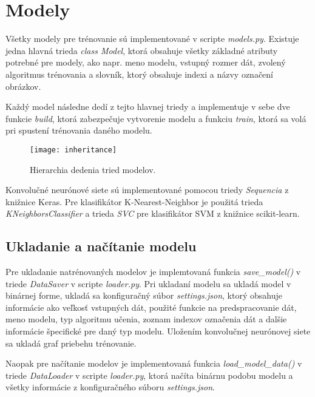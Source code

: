 
\section{Modely}
\label{sec:modely}
Všetky modely pre trénovanie sú implementované v scripte \textit{models.py}.
Existuje jedna hlavná trieda \textit{class Model}, ktorá obsahuje všetky základné atributy potrebné pre modely, ako napr.
    meno modelu, vstupný rozmer dát, zvolený algoritmus trénovania a slovník, ktorý obsahuje indexi a názvy označení obrázkov.

Každý model následne dedí z tejto hlavnej triedy a implementuje v sebe dve funkcie \textit{build}, ktorá zabezpečuje vytvorenie modelu a
    funkciu \textit{train}, ktorá sa volá pri spustení trénovania daného modelu.

\begin{figure}[H]
    \centering
    \texttt{[image: inheritance]}
    \caption{Hierarchia dedenia tried modelov.}
    \label{pic:inheritance}
\end{figure}

Konvolučné neurónové siete sú implementované pomocou triedy \textit{Sequencia} z knižnice Keras.
Pre klasifikátor K-Nearest-Neighbor je použitá trieda \textit{KNeighborsClassifier} a trieda \textit{SVC} pre klasifikátor SVM z knižnice scikit-learn.


\subsection{Ukladanie a načítanie modelu}
\label{subsec:ukladaniemodelu}
Pre ukladanie natrénovaných modelov je implemtovaná funkcia \textit{save\_model()} v triede \textit{DataSaver} v scripte \textit{loader.py}.
Pri ukladaní modelu sa ukladá model v binárnej forme, ukladá sa konfiguračný súbor \textit{settings.json}, ktorý obsahuje informácie ako veľkosť
    vstupných dát, použité funkcie na predspracovanie dát, meno modelu, typ algoritmu učenia, zoznam indexov označenia dát a dalšie informácie
    špecifické pre daný typ modelu.
Uložením konvolučnej neurónovej siete sa ukladá graf priebehu trénovanie.

Naopak pre načítanie modelov je implementovaná funkcia \textit{load\_model\_data()} v triede \textit{DataLoader} v scripte \textit{loader.py},
    ktorá načíta binárnu podobu modelu a všetky informácie z konfiguračného súboru \textit{settings.json}.

